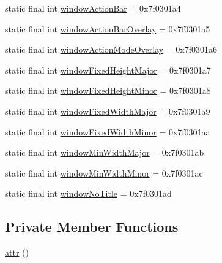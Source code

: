 \begin{DoxyCompactItemize}
static final int \mbox{\hyperlink{classandroid_1_1support_1_1design_1_1_r_1_1attr_aa1af85143de264c6d581a6e6b92a76ea}{window\+Action\+Bar}} = 0x7f0301a4
\item 
static final int \mbox{\hyperlink{classandroid_1_1support_1_1design_1_1_r_1_1attr_a8ddf882018ee59b96161c242b0c15aa4}{window\+Action\+Bar\+Overlay}} = 0x7f0301a5
\item 
static final int \mbox{\hyperlink{classandroid_1_1support_1_1design_1_1_r_1_1attr_aceb508b37cba3b18bf90c79342c9132a}{window\+Action\+Mode\+Overlay}} = 0x7f0301a6
\item 
static final int \mbox{\hyperlink{classandroid_1_1support_1_1design_1_1_r_1_1attr_a116a879901b5c8fd6599597f4d701c91}{window\+Fixed\+Height\+Major}} = 0x7f0301a7
\item 
static final int \mbox{\hyperlink{classandroid_1_1support_1_1design_1_1_r_1_1attr_a0f0ccc630a6cc4c66b09ba8fd1bcf1da}{window\+Fixed\+Height\+Minor}} = 0x7f0301a8
\item 
static final int \mbox{\hyperlink{classandroid_1_1support_1_1design_1_1_r_1_1attr_a5f66d47b3609aef3886dcd603ac63345}{window\+Fixed\+Width\+Major}} = 0x7f0301a9
\item 
static final int \mbox{\hyperlink{classandroid_1_1support_1_1design_1_1_r_1_1attr_a24835259349fddf99fc5c44065de5fb3}{window\+Fixed\+Width\+Minor}} = 0x7f0301aa
\item 
static final int \mbox{\hyperlink{classandroid_1_1support_1_1design_1_1_r_1_1attr_a74613b10ae2f42e095723fcea4f56a36}{window\+Min\+Width\+Major}} = 0x7f0301ab
\item 
static final int \mbox{\hyperlink{classandroid_1_1support_1_1design_1_1_r_1_1attr_a1690dd58d6b1695579d1cbdcb36fa7b4}{window\+Min\+Width\+Minor}} = 0x7f0301ac
\item 
static final int \mbox{\hyperlink{classandroid_1_1support_1_1design_1_1_r_1_1attr_ae7659b443bdf6ecfbb0bb28a213c6670}{window\+No\+Title}} = 0x7f0301ad
\end{DoxyCompactItemize}
\subsection*{Private Member Functions}
\begin{DoxyCompactItemize}
\item 
\mbox{\hyperlink{classandroid_1_1support_1_1design_1_1_r_1_1attr_a7f12ec98c2c59686a0c06a82f577c051}{attr}} ()
\end{DoxyCompactItemize}


